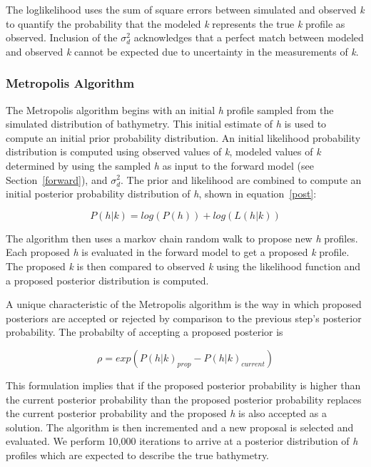 The loglikelihood uses the sum of square errors between simulated and observed \textit{k} to quantify the probability that the modeled \textit{k} represents the true \textit{k} profile as observed. Inclusion of the $\sigma_{d}^2$ acknowledges that a perfect match between modeled and observed \textit{k} cannot be expected due to uncertainty in the measurements of \textit{k}.

\subsubsection{Metropolis Algorithm}
The Metropolis algorithm begins with an initial \textit{h} profile sampled from the simulated distribution of bathymetry. This initial estimate of \textit{h} is used to compute an initial prior probability distribution. An initial likelihood probability distribution is computed using observed values of \textit{k}, modeled values of \textit{k} determined by using the sampled \textit{h} as input to the forward model (see Section~\ref{forward}), and $\sigma_{d}^2$. The prior and likelihood are combined to compute an initial posterior probability distribution of \textit{h}, shown in equation~\ref{post}:

\begin{equation}
P(h|%
k) = log(P(h)) + log(L(h|%
k))
\end{equation}

The algorithm then uses a markov chain random walk to propose new \textit{h} profiles. Each proposed \textit{h} is evaluated in the forward model to get a proposed \textit{k} profile. The proposed \textit{k} is then compared to observed \textit{k} using the likelihood function and a proposed posterior distribution is computed.

A unique characteristic of the Metropolis algorithm is the way in which proposed posteriors are accepted or rejected by comparison to the previous step's posterior probability. The probabilty of accepting a proposed posterior is 

\begin{equation}
\rho = exp(P(h|%
k)_{prop} - P(h|%
k)_{current})
\end{equation}

This formulation implies that if the proposed posterior probability is higher than the current posterior probability than the proposed posterior probability replaces the current posterior probability and the proposed \textit{h} is also accepted as a solution. The algorithm is then incremented and a new proposal is selected and evaluated. We perform 10,000 iterations to arrive at a posterior distribution of \textit{h} profiles which are expected to describe the true bathymetry.















